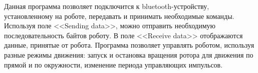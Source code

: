 Данная программа позволяет подключится к bluetooth-устройству, установленному на роботе, передавать и принимать необходимые команды. Используя поле <<Sending data>>, можно отправить необходимую последовательность байтов роботу. В поле <<Receive data>> отображаются данные, принятые от робота. Программа позволяет управлять роботом, используя разные режимы движения: запуск и остановка вращения ротора для движения по прямой и по окружности, изменение периода управляющих импульсов.


%
%
%


\clearpage